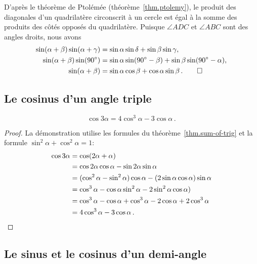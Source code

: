 D'après le théorème de Ptolémée (théorème~\ref{thm.ptolemy}), le produit des diagonales d'un quadrilatère circonscrit à un cercle est égal à la somme des produits des côtés opposés du quadrilatère. Puisque $\angle ADC$ et $\angle ABC$ sont des angles droits, nous avons 
\begin{align*}
\sin (\alpha+\beta)\sin(\alpha+\gamma)&=
\sin \alpha \sin\delta + \sin \beta\sin \gamma,\\
\sin (\alpha+\beta)\sin(90^\circ)&=
\sin \alpha \sin(90^\circ-\beta) + \sin \beta\sin (90^\circ-\alpha),\\
\sin (\alpha+\beta)&=\sin\alpha\cos\beta+\cos\alpha\sin \beta\,. \qed
\end{align*}



\subsection{Le cosinus d'un angle triple}\label{s.cosine}

\begin{theorem}\label{thm.triple-angle}
\[
\cos 3\alpha=4\cos^3\alpha -3\cos\alpha\,.
\]
\end{theorem}
\begin{proof}
La démonstration utilise les formules du théorème~\ref{thm.sum-of-trig} et la formule 
 $\sin^2\alpha+\cos^2\alpha=1$:
\begin{align*}
\cos 3\alpha &= \cos (2\alpha +\alpha)\\
&= \cos 2\alpha\cos\alpha - \sin 2\alpha\sin\alpha\\
&= (\cos^2\alpha -\sin^2\alpha)\cos\alpha - (2\sin\alpha\cos\alpha)\sin\alpha\\
&=\cos^3\alpha - \cos\alpha\sin^2\alpha -2\sin^2\alpha\cos\alpha)\\
&=\cos^3\alpha - \cos\alpha +\cos^3\alpha -2\cos\alpha+2\cos^3\alpha\\
&=4\cos^3\alpha -3\cos\alpha\,.\qedhere
\end{align*}
\end{proof}


\subsection{Le sinus et le cosinus d'un demi-angle}\label{s.sine-cosine-half}

